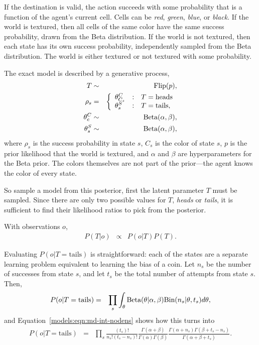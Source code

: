 If the destination is valid, the action succeeds with some probability that is a function of the agent's current cell. Cells can be \emph{red}, \emph{green}, \emph{blue}, or \emph{black}. If the world is textured, then all cells of the same color have the same success probability, drawn from the Beta distribution. If the world is not textured, then each state has its own success probability, independently sampled from the Beta distribution. The world is either textured or not textured with some probability.

The exact model is described by a generative process,
\begin{eqnarray}
T &\sim& \mbox{Flip}(p),\\
\rho_s &=&
\left\{\begin{array}{lll}
 \theta^C_{C_s}&:&T = \mbox{heads} \\
 \theta^S_s&:&T = \mbox{tails} ,
\end{array}\right.\\
\theta^C_c &\sim& \mbox{Beta}(\alpha,\beta),\\
\theta^S_s &\sim& \mbox{Beta}(\alpha,\beta),
\end{eqnarray}
where $\rho_s$ is the success probability in state $s$, $C_s$ is the color of state $s$, $p$ is the prior likelihood that the world is textured, and $\alpha$ and $\beta$ are hyperparameters for the Beta prior. The colors themselves are not part of the prior---the agent knows the color of every state.

So sample a model from this posterior, first the latent parameter $T$ must be sampled. Since there are only two possible values for $T$, \emph{heads} or \emph{tails}, it is sufficient to find their likelihood ratios to pick from the posterior.

With observations $o$,
\begin{eqnarray}
P(T|o) &\propto& P(o|T)P(T).
\end{eqnarray}

Evaluating $P(o|T=\mbox{tails})$ is straightforward: each of the states are a separate learning problem equivalent to learning the bias of a coin. Let $n_s$ be the number of successes from state $s$, and let $t_s$ be the total number of attempts from state $s$. Then,
\begin{eqnarray}
P(o|T=\mbox{tails}) &=& \prod_s \int_{\theta} \mbox{Beta}(\theta|\alpha,\beta) \mbox{Bin}(n_s|\theta,t_s) d\theta,
\end{eqnarray}
and Equation~\ref{models:eqn:md-int-nodens} shows how this turns into
\begin{eqnarray}
P(o|T=\mbox{tails}) &=& \prod_s
\frac
 {\left(t_s\right)!}
 {n_s!(t_s-n_s)!}
\frac
 {\Gamma\left(\alpha+\beta\right)}
 {\Gamma(\alpha)\Gamma(\beta)}
\frac
 {\Gamma(\alpha+n_s)\Gamma(\beta+t_s-n_s)}
 {\Gamma\left(\alpha+\beta+t_s\right)}.
\end{eqnarray}

